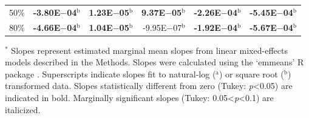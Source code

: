 \begin{landscape}
\begin{table}
{\begin{tabular}{p{2cm}p{3.2cm}p{3.2cm}p{3.2cm}p{3.2cm}p{3.2cm}}
            \multicolumn{1}{r}{50\%}
            &  \multicolumn{1}{r}{\textbf{-3.80E$-$04$^\mathrm{b}$}}
            &  \multicolumn{1}{r}{\textbf{ 1.23E$-$05$^\mathrm{b}$}}
            &  \multicolumn{1}{r}{\textbf{ 9.37E$-$05$^\mathrm{b}$}}
            &  \multicolumn{1}{r}{\textbf{-2.26E$-$04$^\mathrm{b}$}}
            &  \multicolumn{1}{r}{\textbf{-5.45E$-$04$^\mathrm{b}$}}
            \\
              
            \multicolumn{1}{r}{80\%}
            &  \multicolumn{1}{r}{\textbf{-4.66E$-$04$^\mathrm{b}$}}
            &  \multicolumn{1}{r}{\textbf{ 1.04E$-$05$^\mathrm{b}$}}
            &  \multicolumn{1}{r}{-9.95E$-$07$^\mathrm{b}$}
            &  \multicolumn{1}{r}{\textbf{-1.92E$-$04$^\mathrm{b}$}}
            &  \multicolumn{1}{r}{\textbf{-5.67E$-$04$^\mathrm{b}$}}  
            \\
            \hline
        \end{tabular}}
        \label{tab:table2.3}
    \end{table}
\begin{singlespace}
    \noindent $^*$ Slopes represent estimated marginal mean slopes from linear mixed-effects models described in the Methods. Slopes were calculated using the ‘emmeans’ R package . Superscripts indicate slopes fit to natural-log ($^\mathrm{a}$) or square root ($^\mathrm{b}$) transformed data. Slopes statistically different from zero (Tukey: \textit{p}<0.05) are indicated in bold. Marginally significant slopes (Tukey: 0.05<\textit{p}<0.1) are italicized.
\end{singlespace}
\end{landscape}
\clearpage

